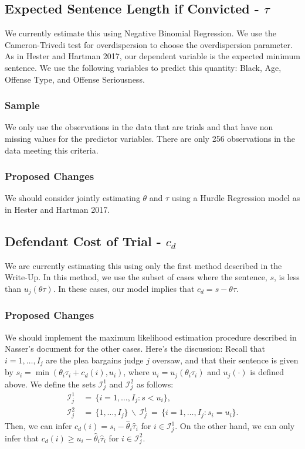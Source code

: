 \documentclass[11pt]{article}
\theoremstyle{ModifiedStyle}
\begin{document}
  \subsection{Expected Sentence Length if Convicted - $\tau$}
    \label{tau-estimation}
    We currently estimate this using Negative Binomial Regression. We use the Cameron-Trivedi test for overdispersion to choose the overdispersion parameter. As in Hester and Hartman 2017, our dependent variable is the expected minimum sentence. We use the following variables to predict this quantity: Black, Age, Offense Type, and Offense Seriousness.

    \subsubsection{Sample}
      We only use the observations in the data that are trials and that have non missing values for the predictor variables. There are only 256 observations in the data meeting this criteria.

    \subsubsection{Proposed Changes}
      We should consider jointly estimating $\theta$ and $\tau$ using a Hurdle Regression model as in Hester and Hartman 2017.

  \subsection{Defendant Cost of Trial - $c_d$}
    \label{c_d-estimation}
    We are currently estimating this using only the first method described in the Write-Up. In this method, we use the subset of cases where the sentence, $s$, is less than $u_j(\theta \tau)$. In these cases, our model implies that $c_d = s - \theta \tau$.

    \subsubsection{Proposed Changes}
      We should implement the maximum likelihood estimation procedure described in Nasser's document for the other cases. Here's the discussion:
      Recall that $i=1,\ldots,I_j$ are the plea bargains judge $j$ oversaw, and that their sentence is given by $s_i=\min(\theta_i\tau_i+c_d(i),u_i)$, where $u_i = u_j(\theta_i\tau_i)$ and $u_j(\cdot)$ is defined above. We define the sets $\mathcal{I}_j^1$ and $\mathcal{I}_j^2$ as follows:
  			\begin{align*}
  				\mathcal{I}_j^1 &\,=\, \{i=1,\ldots,I_j: s < u_i\}, \\
  				\mathcal{I}_j^2 &\,=\, \{1,\ldots,I_j\} \,\backslash\, \mathcal{I}_j^1 \,=\, \{i=1,\ldots,I_j:s_i=u_i\}.
  			\end{align*}
  			Then, we can infer $c_d(i) = s_i - \hat{\theta}_i\hat{\tau}_i$ for $i\in\mathcal{I}_j^1$. On the other hand, we can only infer that $c_d(i) \geq u_i - \hat{\theta}_i\hat{\tau}_i$ for $i\in\mathcal{I}^2_j$.
\end{document}
